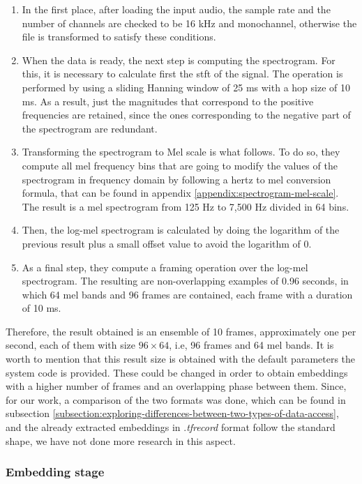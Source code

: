 	\begin{enumerate}
		\item In the first place, after loading the input audio, the sample rate and the number of channels are checked to be 16 kHz and monochannel, otherwise the file is transformed to satisfy these conditions.
		\item When the data is ready, the next step is computing the spectrogram. For this, it is necessary to calculate first the \acrfull{stft} of the signal. The operation is performed by using a sliding Hanning window of 25 ms with a hop size of 10 ms. As a result, just the magnitudes that correspond to the positive frequencies are retained, since the ones corresponding to the negative part of the spectrogram are redundant.
		\item  Transforming the spectrogram to Mel scale is what follows. To do so, they compute all mel frequency bins that are going to modify the values of the spectrogram in frequency domain by following a hertz to mel conversion formula, that can be found in appendix \ref{appendix:spectrogram-mel-scale}. The result is a mel spectrogram from 125 Hz to 7,500 Hz divided in 64 bins.
		\item Then, the log-mel spectrogram is calculated by doing the logarithm of the previous result plus a small offset value to avoid the logarithm of $0$.
		\item As a final step, they compute a framing operation over the log-mel spectrogram. The resulting are non-overlapping examples of 0.96 seconds, in which 64 mel bands and 96 frames are contained, each frame with a duration of 10 ms.
	\end{enumerate}

	Therefore, the result obtained is an ensemble of 10 frames, approximately one per second, each of them with size $96 \times 64$, i.e, 96 frames and 64 mel bands. It is worth to mention that this result size is obtained with the default parameters the system code is provided. These could be changed in order to obtain embeddings with a higher number of frames and an overlapping phase between them. Since, for our work, a comparison of the two formats was done, which can be found in subsection \ref{subsection:exploring-differences-between-two-types-of-data-access}, and the already extracted embeddings in .\textit{tfrecord} format follow the standard shape, we have not done more research in this aspect. 

\subsubsection*{Embedding stage}

